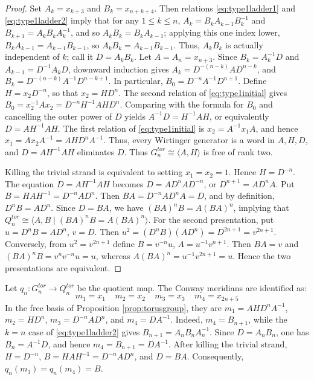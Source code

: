 \documentclass{article}
\theoremstyle{plain}
\theoremstyle{definition}
\theoremstyle{plain}
\theoremstyle{plain}
\theoremstyle{plain}
\theoremstyle{remark}
\theoremstyle{remark}
\theoremstyle{plain}
\theoremstyle{plain}
\theoremstyle{plain}
\theoremstyle{plain}
\begin{document}
\begin{proof}
Set $A_k = x_{k+3}$ and $B_k = x_{n+k+4}$. Then relations \eqref{eq:type1ladder1} and \eqref{eq:type1ladder2} imply that for any $1 \leq k \leq n$, $A_k = B_kA_{k-1}B_k^{-1}$ and $B_{k+1}=A_kB_kA_k^{-1}$, and so $A_kB_k=B_kA_{k-1}$; applying this one index lower, $B_kA_{k-1} = A_{k-1}B_{k-1}$, so $A_kB_k = A_{k-1}B_{k-1}$. Thus, $A_kB_k$ is actually independent of $k$; call it $D = A_kB_k$. Let $A = A_n = x_{n+3}$. Since $B_k = A_k^{-1}D$ and $A_{k-1} = D^{-1}A_kD$, downward induction gives $A_k = D^{-(n-k)}AD^{n-k}$, and $B_k=D^{-(n-k)}A^{-1}D^{n-k+1}$. In particular, $B_0 = D^{-n}A^{-1}D^{n+1}$. Define $H = x_2D^{-n}$, so that $x_2 = HD^n$. The second relation of \eqref{eq:type1initial} gives $B_0 = x_2^{-1}Ax_2 = D^{-n}H^{-1}AHD^n$. Comparing with the formula for $B_0$ and cancelling the outer power of $D$ yields $A^{-1}D = H^{-1}AH$, or equivalently $D = AH^{-1}AH$. The first relation of \eqref{eq:type1initial} is $x_2 = A^{-1}x_1A$, and hence $x_1=Ax_2A^{-1}=AHD^nA^{-1}$. Thus, every Wirtinger generator is a word in $A, H, D$, and $D = AH^{-1}AH$ eliminates $D$. Thus $G_n^{tor} \cong \langle A, H \rangle$ is free of rank two.

\medskip

Killing the trivial strand is equivalent to setting $x_1 = x_2 = 1$. Hence $H=D^{-n}$. The equation $D=AH^{-1}AH$ becomes $D=AD^nAD^{-n}$, or $D^{n+1} = AD^nA$. Put $B = HAH^{-1}=D^{-n}AD^n$. Then $BA=D^{-n}AD^nA=D$, and by definition, $D^nB=AD^n$. Since $D=BA$, we have $(BA)^nB=A(BA)^n$, implying that $Q_n^{tor}\cong\langle A,B\mid(BA)^nB=A(BA)^n\rangle$. For the second presentation, put $u=D^nB = AD^n$, $v=D$. Then $u^2=(D^nB)(AD^n)=D^{2n+1}=v^{2n+1}$. Conversely, from $u^2=v^{2n+1}$ define $B=v^{-n}u$, $A=u^{-1}v^{n+1}$. Then $BA=v$ and $(BA)^nB=v^nv^{-n}u=u$, whereas $A(BA)^n=u^{-1}v^{2n+1}=u$. Hence the two presentations are equivalent. 
\end{proof}

Let $q_n: G_n^{tor} \to Q_n^{tor}$ be the quotient map. The Conway meridians are identified as:
\begin{equation*}
	m_1 = x_1 \ \ \ \ \ m_2 = x_2 \ \ \ \ \ m_3 = x_3 \ \ \ \ \ m_4 = x_{2n+5}
\end{equation*}
In the free basis of Proposition \ref{prop:torusgroup}, they are $m_1 = AHD^nA^{-1}$, $m_2 = HD^n$, $m_3 = D^{-n}AD^n$, and $m_4 = DA^{-1}$. Indeed, $m_4=B_{n+1}$, while the $k=n$ case of \eqref{eq:type1ladder2} gives $B_{n+1}=A_nB_nA_n^{-1}$. Since $D=A_nB_n$, one has $B_n=A^{-1}D$, and hence $m_4=B_{n+1}=DA^{-1}$. After killing the trivial strand, $H=D^{-n}$, $B=HAH^{-1}=D^{-n}AD^n$, and $D=BA$. Consequently, $q_n(m_3)=q_n(m_4)=B$. 
\end{document}
